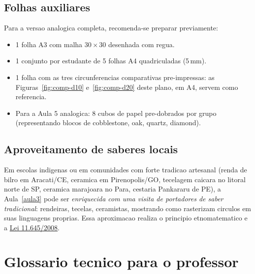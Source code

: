 \documentclass[12pt,a4paper]{scrartcl}
\begin{document}
\subsection{Folhas auxiliares}
Para a versao analogica completa, recomenda-se preparar previamente:
\begin{itemize}[leftmargin=1.3em,itemsep=0.1em,topsep=0.2em,nosep]
  \item 1 folha A3 com malha $30 \times 30$ desenhada com regua.
  \item 1 conjunto por estudante de 5 folhas A4 quadriculadas (5\,mm).
  \item 1 folha com as tres circunferencias comparativas pre-impressas: as Figuras~\ref{fig:comp-d10} e~\ref{fig:comp-d20} deste plano, em A4, servem como referencia.
  \item Para a Aula 5 analogica: 8 cubos de papel pre-dobrados por grupo (representando blocos de cobblestone, oak, quartz, diamond).
\end{itemize}

\subsection{Aproveitamento de saberes locais}
Em escolas indigenas ou em comunidades com forte tradicao artesanal (renda de bilro em Aracati/CE, ceramica em Pirenopolis/GO, tecelagem caicara no litoral norte de SP, ceramica marajoara no Para, cestaria Pankararu de PE), a Aula~\ref{aula3} pode ser \emph{enriquecida com uma visita de portadores de saber tradicional}: rendeiras, tecelas, ceramistas, mostrando como rasterizam circulos em suas linguagens proprias. Essa aproximacao realiza o principio etnomatematico e a \href{https://www.planalto.gov.br/ccivil_03/_ato2007-2010/2008/lei/l11645.htm}{Lei 11.645/2008}.

\newpage
\section{Glossario tecnico para o professor}\label{ap:glos}
\end{document}
